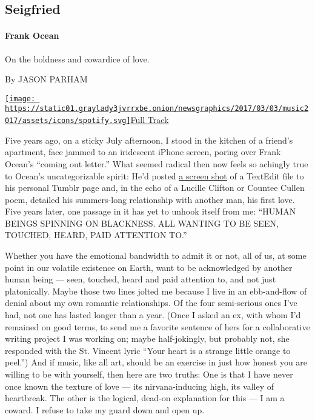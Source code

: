 \hypertarget{--seigfried}{%
\subsection{\texorpdfstring{
Seigfried}{  Seigfried}}\label{--seigfried}}

\hypertarget{frank-ocean}{%
\paragraph{Frank Ocean}\label{frank-ocean}}

On the boldness and cowardice of love.

By JASON PARHAM

\href{https://open.spotify.com/track/1BViPjTT585XAhkUUrkts0}{\texttt{[image: https://static01.graylady3jvrrxbe.onion/newsgraphics/2017/03/03/music2017/assets/icons/spotify.svg]}Full
Track}

Five years ago, on a sticky July afternoon, I stood in the kitchen of a
friend's apartment, face jammed to an iridescent iPhone screen, poring
over Frank Ocean's ``coming out letter.'' What seemed radical then now
feels so achingly true to Ocean's uncategorizable spirit: He'd posted
\href{http://frankocean.tumblr.com/post/26473798723}{a screen shot} of a
TextEdit file to his personal Tumblr page and, in the echo of a Lucille
Clifton or Countee Cullen poem, detailed his summers-long relationship
with another man, his first love. Five years later, one passage in it
has yet to unhook itself from me: ``HUMAN BEINGS SPINNING ON BLACKNESS.
ALL WANTING TO BE SEEN, TOUCHED, HEARD, PAID ATTENTION TO.''

Whether you have the emotional bandwidth to admit it or not, all of us,
at some point in our volatile existence on Earth, want to be
acknowledged by another human being --- seen, touched, heard and paid
attention to, and not just platonically. Maybe those two lines jolted me
because I live in an ebb-and-flow of denial about my own romantic
relationships. Of the four semi-serious ones I've had, not one has
lasted longer than a year. (Once I asked an ex, with whom I'd remained
on good terms, to send me a favorite sentence of hers for a
collaborative writing project I was working on; maybe half-jokingly, but
probably not, she responded with the St. Vincent lyric ``Your heart is a
strange little orange to peel.'') And if music, like all art, should be
an exercise in just how honest you are willing to be with yourself, then
here are two truths: One is that I have never once known the texture of
love --- its nirvana-inducing high, its valley of heartbreak. The other
is the logical, dead-on explanation for this --- I am a coward. I refuse
to take my guard down and open up.

